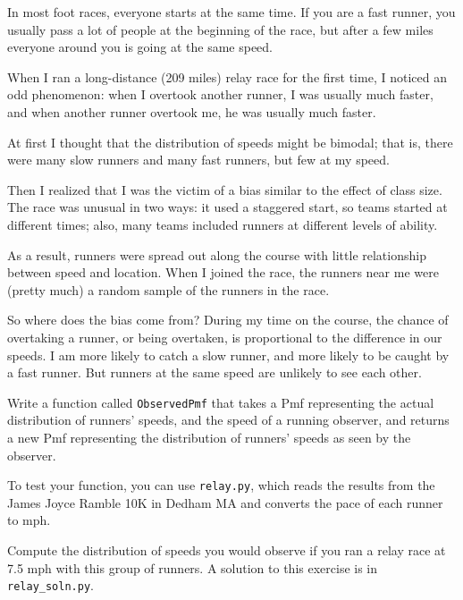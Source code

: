 \documentclass[12pt]{book}
\begin{document}
\begin{exercise}
\label{relay}

In most foot races, everyone starts at the same time.  If you are a
fast runner, you usually pass a lot of people at the beginning of the
race, but after a few miles everyone around you is going at the same
speed.

When I ran a long-distance (209 miles) relay race for the first
time, I noticed an odd phenomenon: when I overtook another runner, I
was usually much faster, and when another runner overtook me, he was
usually much faster.

At first I thought that the distribution of speeds might be bimodal;
that is, there were many slow runners and many fast runners, but few
at my speed.

Then I realized that I was the victim of a bias similar to the
effect of class size.  The race
was unusual in two ways: it used a staggered start, so teams started
at different times; also, many teams included runners at different
levels of ability.  

As a result, runners were spread out along the course with little
relationship between speed and location.  When I joined the race, the
runners near me were (pretty much) a random sample of the runners in
the race.

So where does the bias come from?  During my time on the course, the
chance of overtaking a runner, or being overtaken, is proportional to
the difference in our speeds.  I am more likely to catch a slow
runner, and more likely to be caught by a fast runner.  But runners
at the same speed are unlikely to see each other.

Write a function called {\tt ObservedPmf} that takes a Pmf representing
the actual distribution of runners' speeds, and the speed of a running
observer, and returns a new Pmf representing the distribution of
runners' speeds as seen by the observer.

To test your function, you can use {\tt relay.py}, which  reads the
results from the James Joyce Ramble 10K in Dedham MA and converts the
pace of each runner to mph.

Compute the distribution of speeds you would observe if you ran a
relay race at 7.5 mph with this group of runners.  A solution to this
exercise is in \verb"relay_soln.py".
\end{exercise}
\end{document}
